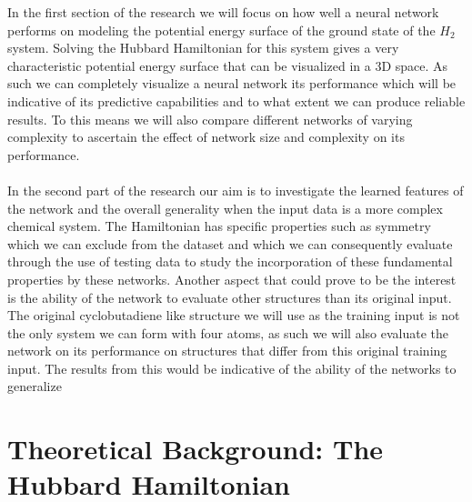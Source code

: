\documentclass[12pt]{article}
\begin{document}
In the first section of the research we will focus on how well a neural network performs on modeling the potential energy surface of the ground state of the $H_2$ system. Solving the Hubbard Hamiltonian for this system gives a very characteristic potential energy surface that can be visualized in a 3D space. As such we can completely visualize a neural network its performance which will be indicative of its predictive capabilities and to what extent we can produce reliable results. To this means we will also compare different networks of varying complexity to ascertain the effect of network size and complexity on its performance.   
\\
\\
In the second part of the research our aim is to investigate the learned features of the network and the overall generality  when the input data is a more complex chemical system. The Hamiltonian has specific properties such as symmetry which we can exclude from the dataset and which we can consequently evaluate through the use of testing data to study the incorporation of these fundamental properties by these networks. Another aspect that could prove to be the interest is the ability of the network to evaluate other structures than its original input. The original cyclobutadiene like structure we will use as the training input is not the only system we can form with four atoms, as such we will also evaluate the network on its performance on structures that differ from this original training input. The results from this would be indicative of the ability of the networks to generalize 

\newpage
\section{Theoretical Background: The Hubbard Hamiltonian}
\end{document}
